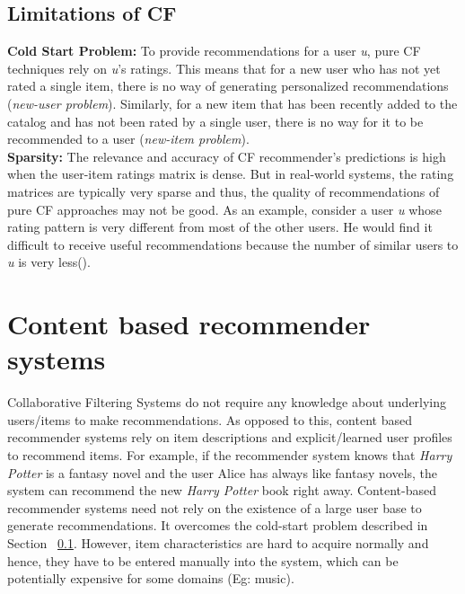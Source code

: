 \subsection{Limitations of CF}
\label{sec:limCF}
\textbf{Cold Start Problem:} To provide recommendations for a user \textit{u}, pure CF techniques rely on \textit{u}'s ratings. This means that for a new user who has not yet rated a single item, there is no way of generating personalized recommendations (\textit{new-user problem}). 
Similarly, for a new item that has been recently added to the catalog and has not been rated by a single user, there is no way for it to be recommended to a user (\textit{new-item problem}).\\
\textbf{Sparsity:} The relevance and accuracy of CF recommender's predictions is high when the user-item ratings matrix is dense.
But in real-world systems, the rating matrices are typically very sparse and thus, the quality of recommendations of pure CF approaches may not be good.
As an example, consider a user \textit{u} whose rating pattern is very different from most of the other users. 
He would find it difficult to receive useful recommendations because the number of similar users to \textit{u} is very less(\cite{balab1997}).




%

%

\section{Content based recommender systems}
\label{sec:content}
Collaborative Filtering Systems do not require any knowledge about underlying users/items to make recommendations.
As opposed to this, content based recommender systems rely on item descriptions and explicit/learned user profiles to recommend items.
For example, if the recommender system knows that \textit{Harry Potter} is a fantasy novel and the user Alice has always like fantasy novels, the system can recommend the new \textit{Harry Potter} book right away. 
Content-based recommender systems need not rely on the existence of a large user base to generate recommendations.
It overcomes the cold-start problem described in Section ~\ref{sec:limCF}. However, item characteristics are hard to acquire normally and hence, they have to be entered manually into the system, which can be potentially expensive for some domains (Eg: music).

